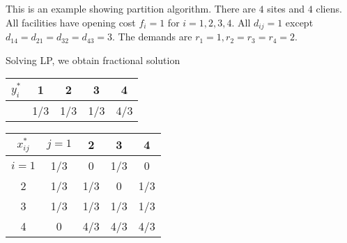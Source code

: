 \documentclass{article}
\begin{document}
This is an example showing partition algorithm. There are $4$ sites
and $4$ cliens. All facilities have opening cost $f_i=1$ for
$i=1,2,3,4$. All $d_{ij}=1$ except $d_{14} = d_{21} = d_{32} = d_{43}
= 3$. The demands are $r_1=1, r_2=r_3=r_4=2$.

Solving LP, we obtain fractional solution
\begin{table}[ht,center]
  \begin{subtable}{0.5\textwidth}
  \centering
  \begin{tabular}{c | c c c c}
    $y_i^\ast$ & 1 & 2 & 3 & 4\\
    \hline
    & 1/3 & 1/3 & 1/3 & 4/3\\
  \end{tabular}
\end{subtable}
%
\begin{subtable}{0.5\textwidth}
  \centering
  \begin{tabular}{c | c c c c}
    $x_{ij}^\ast$ & $j=1$ & 2 & 3 & 4\\
    \hline
    $i=1$ & 1/3 & 0   & 1/3 & 0\\
    2 & 1/3 & 1/3 & 0   & 1/3\\
    3 & 1/3 & 1/3 & 1/3 & 1/3\\
    4 & 0   & 4/3 & 4/3 & 4/3\\
  \end{tabular}
\end{subtable}
\end{table}
\end{document}
